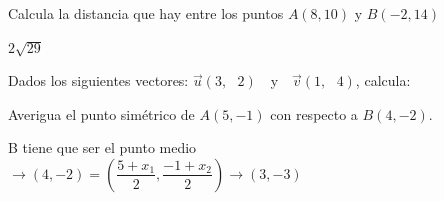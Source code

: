 \documentclass[spanish, 11pt]{exam}
\begin{document}
\begin{questions}

\question Calcula la distancia que hay entre los puntos  
$A(8,10)$ y $B(-2,14)$
\begin{solution}
$2\sqrt{29}$
\end{solution}
\question	Dados los siguientes vectores: $\overrightarrow u \left( {3,{\text{ }}2} \right){\text{ }}$ y ${\text{ }}\overrightarrow v \left( {1,{\text{ }}4} \right)$, calcula:
\begin{multicols}{4}
\end{multicols}

\question Averigua el punto simétrico de $A(5, -1)$ con respecto a $B(4, -2)$.
\begin{solution} B tiene que ser el punto medio \\
 $ \to (4,-2)=(\dfrac{5+x_1}{2},\dfrac{-1+x_2}{2})\to (3,-3) $\end{solution}


\end{questions}
\end{document}
